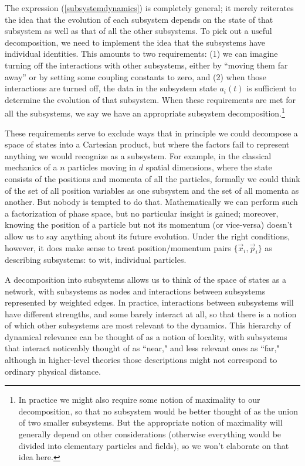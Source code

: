 \documentclass[12pt,english]{article}
\begin{document}
The expression (\ref{subsystemdynamics}) is completely general; it merely reiterates the idea that the evolution of each subsystem depends on the state of that subsystem as well as that of all the other subsystems.
To pick out a useful decomposition, we need to implement the idea that the subsystems have individual identities.
This amounts to two requirements: (1) we can imagine turning off the interactions with other subsystems, either by ``moving them far away'' or by setting some coupling constants to zero, and (2) when those interactions are turned off, the data in the subsystem state $a_i(t)$ is sufficient to determine the evolution of that subsystem.
When these requirements are met for all the subsystems, we say we have an appropriate subsystem decomposition.\footnote{In practice we might also require some notion of maximality to our decomposition, so that no subsystem would be better thought of as the union of two smaller subsystems. But the appropriate notion of maximality will generally depend on other considerations (otherwise everything would be divided into elementary particles and fields), so we won't elaborate on that idea here.}

These requirements serve to exclude ways that in principle we could decompose a space of states into a Cartesian product, but where the factors fail to represent anything we would recognize as a subsystem.
For example, in the classical mechanics of a $n$ particles moving in $d$ spatial dimensions, where the state consists of the positions and momenta of all the particles, formally we could think of the set of all position variables as one subsystem and the set of all momenta as another.
But nobody is tempted to do that.
Mathematically we can perform such a factorization of phase space, but no particular insight is gained; moreover, knowing the position of a particle but not its momentum (or vice-versa) doesn't allow us to say anything about its future evolution.
Under the right conditions, however, it does make sense to treat position/momentum pairs $\{\vec{x}_i, \vec{p}_i\}$ as describing subsystems: to wit, individual particles.

A decomposition into subsystems allows us to think of the space of states as a network, with subsystems as nodes and interactions between subsystems represented by weighted edges.
In practice, interactions between subsystems will have different strengths, and some barely interact at all, so that there is a notion of which other subsystems are most relevant to the dynamics.
This hierarchy of dynamical relevance can be thought of as a notion of locality, with subsystems that interact noticeably thought of as ``near," and less relevant ones as ``far," although in higher-level theories those descriptions might not correspond to ordinary physical distance.
\end{document}
